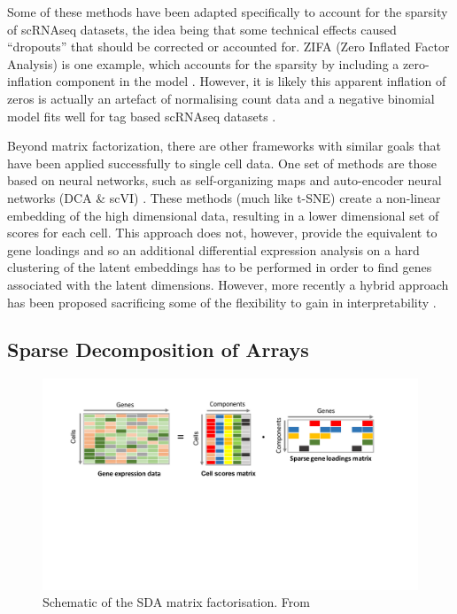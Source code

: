 
Some of these methods have been adapted specifically to account for the sparsity of scRNAseq datasets, the idea being that some technical effects caused ``dropouts'' that should be corrected or accounted for. ZIFA (Zero Inflated Factor Analysis) is one example, which accounts for the sparsity by including a zero-inflation component in the model \parencite{Pierson2015ZIFA}. However, it is likely this apparent inflation of zeros is actually an artefact of normalising count data and a negative binomial model fits well for tag based scRNAseq datasets \parencite{Vieth2017powsimR, Svensson2019Droplet, Townes2019Feature}.

Beyond matrix factorization, there are other frameworks with similar goals that have been applied successfully to single cell data. One set of methods are those based on neural networks, such as self-organizing maps \parencite{Loffler-Wirth2015oposSOM, Kim2015SingleCell} and auto-encoder neural networks (DCA \& scVI) \parencite{Eraslan2019Singlecell, Lopez2018Deep}. These methods (much like t-SNE) create a non-linear embedding of the high dimensional data, resulting in a lower dimensional set of scores for each cell. This approach does not, however, provide the equivalent to gene loadings and so an additional differential expression analysis on a hard clustering of the latent embeddings has to be performed in order to find genes associated with the latent dimensions. However, more recently a hybrid approach has been proposed sacrificing some of the flexibility to gain in interpretability \parencite{Svensson2019Interpretable}.


\subsection{Sparse Decomposition of Arrays}


\begin{figure}[H]
	\centering
	\includegraphics[width=\textwidth]{figures/intro/matrix_decomp_cells.pdf}
	\caption[SDA Matrix Factorisation]{Schematic of the SDA matrix factorisation. From \parencite{Hore2015Latent}}
	\label{fig:SDAfactorisation}
\end{figure}

